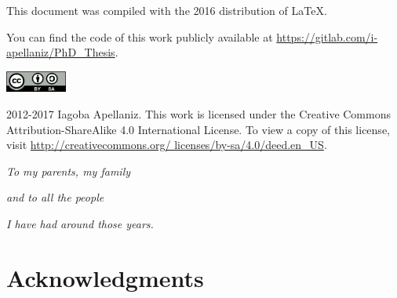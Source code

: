 \documentclass[12pt, letterpaper, twoside]{article}
\numberwithin{equation}{section}
\numberwithin{figure}{section}
\numberwithin{table}{section}
\begin{document}
\renewcommand{\thefootnote}{\fnsymbol{footnote}}

\pagestyle{fancy}
\renewcommand{\headrulewidth}{0pt}
\fancyhead{}
\fancyfoot{}





\cleardoublepage

This document was compiled with the 2016 distribution of \LaTeX.

You can find the code of this work publicly available at \url{https://gitlab.com/i-apellaniz/PhD_Thesis}.

\vfill

\includegraphics[height=20pt]{img/0-CreativeCommons-by-sa.png}

2012-2017 Iagoba Apellaniz. This work is licensed under the Creative Commons
Attribution-ShareAlike 4.0 International License. To view a copy of this
license, visit
\href{http://creativecommons.org/licenses/by-sa/4.0/deed.en_US}
{http://creativecommons.org/ licenses/by-sa/4.0/deed.en\_US}.
\clearpage






\cleardoublepage

\fancyfoot{}

\cleardoublepage
\setcounter{page}{1}

\vspace*{100pt}
\begin{center}
\emph{To my parents, my family}

\emph{and to all the people}

\emph{I have had around those years.}
\end{center}

\cleardoublepage

\fancyfoot[LE,RO]{\thepage}
\section*{Acknowledgments}
\end{document}
